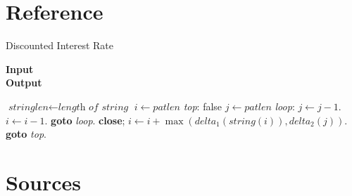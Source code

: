 


\chapter{Reference}\label{sec:something}

    \begin{algorithm}
    \caption{Discounted Interest Rate}\label{euclid}
    \hspace*{\algorithmicindent} \textbf{Input} \\
    \hspace*{\algorithmicindent} \textbf{Output} 
    \begin{algorithmic}[1]
    \State $\textit{stringlen} \gets \textit{length of } \textit{string}$
    \State $i \gets \textit{patlen}$
    \BState \emph{top}:
     \Return false
    \EndIf
    \State $j \gets \textit{patlen}$
    \BState \emph{loop}:
    \State $j \gets j-1$.
    \State $i \gets i-1$.
    \State \textbf{goto} \emph{loop}.
    \State \textbf{close};
    \EndIf
    \State $i \gets i+\max(\textit{delta}_1(\textit{string}(i)),\textit{delta}_2(j))$.
    \State \textbf{goto} \emph{top}.
    \EndProcedure
    \end{algorithmic}
    \end{algorithm}

 \cleardoublepage

\chapter{Sources}

